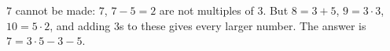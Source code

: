 $7$ cannot be made: $7$, $7-5=2$ are not multiples of $3$. But $8=3+5$, $9=3\cdot3$, $10=5\cdot2$, and adding $3$s to these gives every larger number. The answer is $\boxed{7}=3\cdot5-3-5$.
